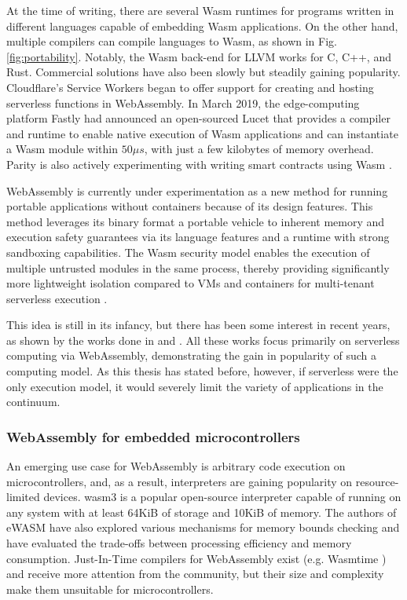 At the time of writing, there are several Wasm runtimes for programs written in different languages capable of embedding Wasm applications. On the other hand, multiple compilers can compile languages to Wasm, as shown in Fig. \ref{fig:portability}. Notably, the Wasm back-end for LLVM \cite{llvm} works for C, C++, and Rust. Commercial solutions have also been slowly but steadily gaining popularity. Cloudflare's Service Workers \cite{cloudflare-workers} began to offer support for creating and hosting serverless functions in WebAssembly. In March 2019, the edge-computing platform Fastly had announced an open-sourced Lucet \cite{fastly-lucet} that provides a compiler and runtime to enable native execution of Wasm applications and can instantiate a Wasm module within $50\mu s$, with just a few kilobytes of memory overhead. Parity is also actively experimenting with writing smart contracts using Wasm \cite{parity-wasm}.

WebAssembly is currently under experimentation as a new method for running portable applications without containers because of its design features. This method leverages its binary format a portable vehicle to inherent memory and execution safety guarantees via its language features and a runtime with strong sandboxing capabilities. The Wasm security model enables the execution of multiple untrusted modules in the same process, thereby providing significantly more lightweight isolation compared to VMs and containers for multi-tenant serverless execution \cite{gadepalli2020sledge}.

This idea is still in its infancy, but there has been some interest in recent years, as shown by the works done in \cite{hall2019execution} and \cite{shillaker2020faasm}. All these works focus primarily on serverless computing via WebAssembly, demonstrating the gain in popularity of such a computing model. As this thesis has stated before, however, if serverless were the only execution model, it would severely limit the variety of applications in the continuum.

\subsubsection{WebAssembly for embedded microcontrollers}

An emerging use case for WebAssembly is arbitrary code execution on microcontrollers, and, as a result, interpreters are gaining popularity on resource-limited devices. wasm3 \cite{wasm3} is a popular open-source interpreter capable of running on any system with at least 64KiB of storage and 10KiB of memory. The authors of eWASM \cite{peach2020ewasm} have also explored various mechanisms for memory bounds checking and have evaluated the trade-offs between processing efficiency and memory consumption. Just-In-Time compilers for WebAssembly exist (e.g. Wasmtime \cite{wasmtime}) and receive more attention from the community, but their size and complexity make them unsuitable for microcontrollers.

